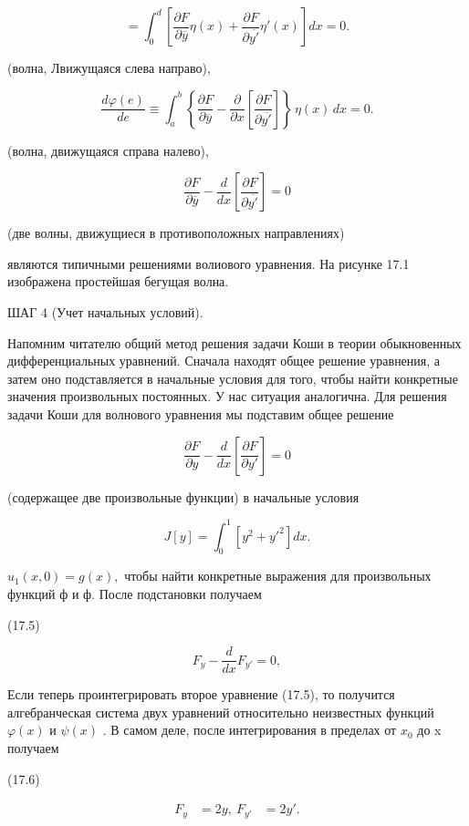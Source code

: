 \documentclass[
  ukrainian,
]{article}
\begin{document}
\[
= \int_{0}^{d} \left[\frac{\partial F}{\partial \overline{y}} \eta\left(x\right) + \frac{\partial F}{\partial \overline{y'}} \eta'\left(x\right)\right] dx = 0.
\]

(волна, Лвижущаяся слева направо),

\[
\frac{d\varphi(e)}{de} \equiv \int_{a}^{b} \left\{ \frac{\partial F}{\partial \overline{y}} - \frac{\partial}{\partial x} \left[ \frac{\partial F}{\partial \overline{y'}} \right] \right\} \, \eta(x) \, dx = 0.
\]

(волна, движущаяся справа налево),

\[
\frac{\partial F}{\partial \overline{y}} - \frac{d}{dx} \left[ \frac{\partial F}{\partial \overline{y'}} \right] = 0
\]

(две волны, движущиеся в противоположных направлениях)

являются типичными решениями волиового уравнения. На рисунке 17.1
изображена простейшая бегущая волна.

ШАГ 4 (Учет начальных условий).

Напомним читателю общий метод решения задачи Коши в теории обыкновенных
дифференциальных уравнений. Сначала находят общее решение уравнения, а
затем оно подставляется в начальные условия для того, чтобы найти
конкретные значения произвольных постоянных. У нас ситуация аналогична.
Для решения задачи Коши для волнового уравнения мы подставим общее
решение

\[
\frac{\partial F}{\partial y} - \frac{d}{dx} \left[ \frac{\partial F}{\partial y'} \right] = 0
\]

(содержащее две произвольные функции) в начальные условия

\[
J[y] = \int_{0}^{1} [y^{2} + y'^{2}] dx.
\]

\(u_1(x, 0) = g(x),\) чтобы найти конкретные выражения для произвольных
функций ф и ф. После подстановки получаем

(17.5)

\[
F_y - \frac{d}{dx} F_{y'} = 0,
\]

Если теперь проинтегрировать второе уравнение (17.5), то получится
алгебранческая система двух уравнений относительно неизвестных функций
\(\varphi(x)\) и \(\psi(x)\) . В самом деле, после интегрирования в
пределах от \(x_0\) до x получаем

(17.6)

\[
\begin{aligned} F_y &= 2y, \ F_{y'} &= 2y'. \end{aligned}
\]
\end{document}
